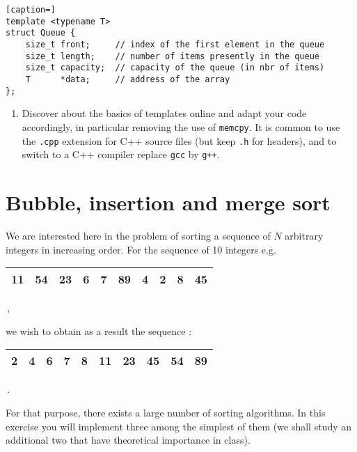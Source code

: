\documentclass[a4paper,12pt]{article}
\begin{document}
\begin{lstlisting}[caption=]
template <typename T>
struct Queue {
	size_t front;     // index of the first element in the queue
	size_t length;    // number of items presently in the queue
	size_t capacity;  // capacity of the queue (in nbr of items)
	T      *data;     // address of the array
};
\end{lstlisting}
\begin{enumerate}
\item[]
Discover about the basics of templates online and adapt your code accordingly, in particular removing the use of {\tt memcpy}. It is common to use the {\tt .cpp} extension for C++ source files (but keep {\tt .h} for headers), and to switch to a C++ compiler replace {\tt gcc} by {\tt g++}.  
\end{enumerate}

\section{Bubble, insertion and merge sort}

We are interested here in the problem of sorting a sequence of $N$ arbitrary integers 
in increasing order. For the sequence of 10 integers e.g.
\begin{center}
  \begin{tabular}{|c|c|c|c|c|c|c|c|c|c|}
    \hline 11 & 54 & 23 & 6 & 7 & 89 & 4 & 2 & 8 & 45 \\ \hline
  \end{tabular}\,,
\end{center}
we wish to obtain as a result the sequence :
\begin{center}
  \begin{tabular}{|c|c|c|c|c|c|c|c|c|c|}
    \hline 2 & 4 & 6 & 7 & 8 & 11 & 23 & 45 & 54 & 89 \\ \hline
  \end{tabular}\,.
\end{center}
For that purpose, there exists a large number of sorting algorithms.
In this exercise you will implement three among the simplest of them 
(we shall study an additional two that have theoretical importance 
in class).
\end{document}

